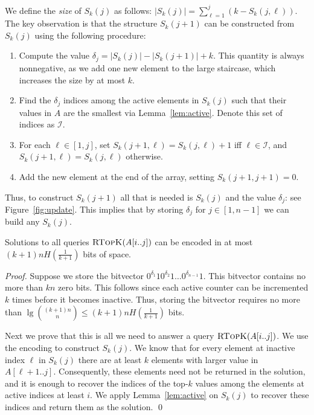 \documentclass[runningheads]{llncs}
\newcommand{\rtopk}{\textsc{RTopK}}
\begin{document}
We define the \emph{size} of $S_k(j)$ as follows: $|S_k(j)| =
\sum_{\ell = 1}^{j} (k - S_k(j,\ell))$.  The key observation is that
the structure $S_k(j+1)$ can be constructed from $S_k(j)$ using the
following procedure:

\begin{enumerate}
\item Compute the value $\delta_{j} = |S_k(j)| - |S_k(j+1)| + k$. This
  quantity is always nonnegative, as we add one new element to the
  large staircase, which increases the size by at most $k$.

\item Find the $\delta_j$ indices among the active elements in
  $S_k(j)$ such that their values in $A$ are the smallest via
  Lemma~\ref{lem:active}.  Denote this set of indices as
  $\mathcal{I}$.

\item For each $\ell \in [1,j]$, set $S_k(j+1,\ell) = S_k(j,\ell)+1$
  iff $\ell \in \mathcal{I}$, and $S_k(j+1,\ell) = S_k(j,\ell)$
  otherwise.

\item Add the new element at the end of the array, setting
  $S_k(j+1,j+1) = 0$.
\end{enumerate}

Thus, to construct $S_k(j+1)$ all that is needed is $S_k(j)$ and the
value $\delta_j$: see Figure~\ref{fig:update}.  This implies that by
storing $\delta_j$ for $j \in [1,n-1]$ we can build any $S_k(j)$.

\begin{theorem}
\label{thm:top-k-ub}
Solutions to all queries $\rtopk(A[i..j])$ can be encoded in at most
$(k+1)nH(\frac{1}{k+1})$ bits of space.
\end{theorem}

\begin{proof}
Suppose we store the bitvector $0^{\delta_1}10^{\delta_2}1\ldots
0^{\delta_{n-1}}1$.  This bitvector contains no more than $kn$ zero
bits.  This follows since each active counter can be incremented $k$
times before it becomes inactive.  Thus, storing the bitvector
requires no more than $\lg \binom{(k+1)n}{n} \le
(k+1)nH(\frac{1}{k+1})$ bits.

Next we prove that this is all we need to answer a query $\rtopk(A[i..j])$.  We
use the encoding to construct $S_k(j)$. We know that
for every element at inactive index $\ell$ in $S_k(j)$ there are at
least $k$ elements with larger value in $A[\ell + 1..j]$. Consequently,
these elements need not be returned in the solution, and
it is enough to recover the indices of the top-$k$ values among the elements
at active indices at least $i$. We apply  Lemma~\ref{lem:active} on $S_k(j)$ to
recover these indices and return them as the solution.
\qed
\end{proof}
\end{document}
